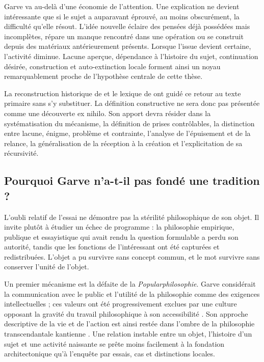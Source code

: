 \documentclass[11pt,a4paper]{article}
\begin{document}
Garve va au-delà d'une économie de l'attention. Une explication ne devient
intéressante que si le sujet a auparavant éprouvé, au moins obscurément, la
difficulté qu'elle résout. L'idée nouvelle éclaire des pensées déjà possédées
mais incomplètes, répare un manque rencontré dans une opération ou se construit
depuis des matériaux antérieurement présents. Lorsque l'issue devient certaine,
l'activité diminue. Lacune aperçue, dépendance à l'histoire du sujet,
continuation désirée, construction et auto-extinction locale forment ainsi un
noyau remarquablement proche de l'hypothèse centrale de cette thèse.

La reconstruction historique de \textcite{nannini2018garve} et le lexique de
\textcite{nannini2018interesting} ont guidé ce retour au texte primaire sans s'y
substituer. La définition constructive ne sera donc pas présentée comme une
découverte ex nihilo. Son apport devra résider dans la systématisation du
mécanisme, la définition de prises contrôlables, la distinction entre lacune,
énigme, problème et contrainte, l'analyse de l'épuisement et de la relance, la
généralisation de la réception à la création et l'explicitation de sa
récursivité.

\subsection{Pourquoi Garve n'a-t-il pas fondé une tradition ?}

L'oubli relatif de l'essai ne démontre pas la stérilité philosophique de son
objet. Il invite plutôt à étudier un échec de programme : la philosophie
empirique, publique et essayistique qui avait rendu la question formulable a
perdu son autorité, tandis que les fonctions de l'intéressant ont été capturées
et redistribuées. L'objet a pu survivre sans concept commun, et le mot survivre
sans conserver l'unité de l'objet.

Un premier mécanisme est la défaite de la \emph{Popularphilosophie}. Garve
considérait la communication avec le public et l'utilité de la philosophie comme
des exigences intellectuelles ; ces valeurs ont été progressivement exclues par
une culture opposant la gravité du travail philosophique à son accessibilité
\parencite{thompson2018garve}. Son approche descriptive de la vie et de l'action
est ainsi restée dans l'ombre de la philosophie transcendantale kantienne
\parencite{bachmannmedick2008anziehungskraft}. Une relation instable entre un
objet, l'histoire d'un sujet et une activité naissante se prête moins facilement
à la fondation architectonique qu'à l'enquête par essais, cas et distinctions
locales.
\end{document}
